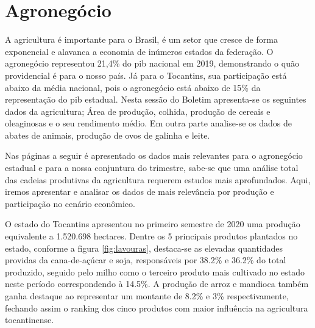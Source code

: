 \chapter{Agronegócio}
\par A agricultura é importante para o Brasil, é um setor que cresce de forma exponencial e alavanca a economia de inúmeros estados da federação. O agronegócio representou 21,4\% do \acrshort{pib} nacional em 2019, demonstrando o quão providencial é para o nosso país. Já para o Tocantins, sua participação está abaixo da média nacional, pois o agronegócio está abaixo de 15\% da representação do \acrshort{pib} estadual. Nesta sessão do Boletim apresenta-se os seguintes dados da agricultura; Área de produção, colhida, produção de cereais e oleaginosas e o seu rendimento médio. Em outra parte analise-se os dados de abates de animais, produção de ovos de galinha e leite.
\par Nas páginas a seguir é apresentado os dados mais relevantes para o agronegócio estadual e para a nossa conjuntura do trimestre, sabe-se que uma análise total das cadeias produtivas da agricultura requerem estudos mais aprofundados. Aqui, iremos apresentar e analisar os dados de mais relevância por produção e participação no cenário econômico.

\par O estado do Tocantins apresentou no primeiro semestre de 2020 uma produção  equivalente a 1.520.698 hectares. Dentre os 5 principais produtos plantados no estado, conforme a figura \ref{fig:lavouras}, destaca-se as elevadas quantidades providas da cana-de-açúcar e soja, responsáveis por 38.2\% e 36.2\% do total produzido, seguido pelo milho como o terceiro produto mais cultivado no estado neste período correspondendo à 14.5\%. A produção de arroz e mandioca também ganha destaque ao representar um montante de 8.2\% e 3\% respectivamente, fechando assim o ranking dos cinco produtos com maior influência na agricultura tocantinense.

